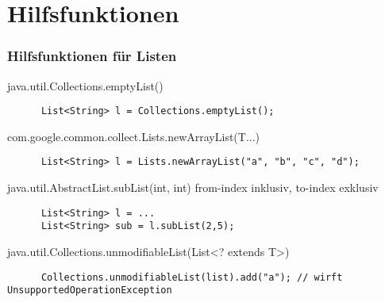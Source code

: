 \section{Hilfsfunktionen}

\begin{frame}[fragile]
  \frametitle{Hilfsfunktionen für Listen}

  \begin{block}{java.util.Collections.emptyList()}
    \begin{lstlisting}
      List<String> l = Collections.emptyList();
    \end{lstlisting}
  \end{block}

  \pause
  
  \begin{block}{com.google.common.collect.Lists.newArrayList(T...)}
    \begin{lstlisting}
      List<String> l = Lists.newArrayList("a", "b", "c", "d");
    \end{lstlisting}
  \end{block}

  \pause
  
  \begin{block}{java.util.AbstractList.subList(int, int)}
    from-index inklusiv, to-index exklusiv
    \begin{lstlisting}
      List<String> l = ...
      List<String> sub = l.subList(2,5);
    \end{lstlisting}
  \end{block}
  
  \pause
  
  \begin{block}{java.util.Collections.unmodifiableList(List\textless? extends T\textgreater)}
    \begin{lstlisting}
      Collections.unmodifiableList(list).add("a"); // wirft UnsupportedOperationException
    \end{lstlisting}
  \end{block}

\end{frame}

